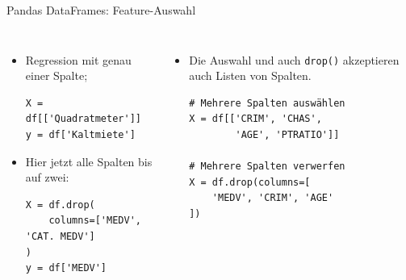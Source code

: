 \begin{frame}[fragile]{Pandas DataFrames: Feature-Auswahl}
\begin{columns}
\begin{itemize}
\item Regression mit genau einer Spalte;
\begin{verbatim}
X = df[['Quadratmeter']]
y = df['Kaltmiete']
\end{verbatim}

\item Hier jetzt alle Spalten bis auf zwei:
\begin{verbatim}
X = df.drop(
    columns=['MEDV', 'CAT. MEDV']
)
y = df['MEDV']
\end{verbatim}
\end{itemize}


\begin{itemize}
\item Die Auswahl und auch \texttt{drop()} akzeptieren auch Listen von Spalten.
\begin{verbatim}
# Mehrere Spalten auswählen
X = df[['CRIM', 'CHAS',
        'AGE', 'PTRATIO']]

# Mehrere Spalten verwerfen
X = df.drop(columns=[
    'MEDV', 'CRIM', 'AGE'
])
\end{verbatim}

\end{itemize}

\end{columns}

\end{frame}


\makequizpage{\QUIZURL}{\QUIZQRCODE}{\QUIZIMAGE}
\makequestionspage{\FRAGENIMAGE}